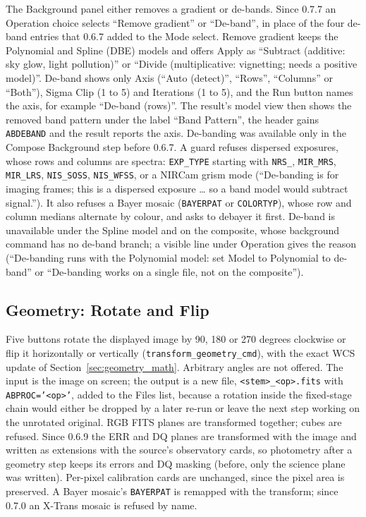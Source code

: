 \documentclass[11pt,a4paper]{article}
\newcommand{\code}[1]{\texttt{\small #1}}
\begin{document}
    The Background panel either removes a gradient or de-bands. Since 0.7.7 an Operation choice selects ``Remove gradient'' or ``De-band'', in place of the four de-band entries that 0.6.7 added to the Mode select. Remove gradient keeps the Polynomial and Spline (DBE) models and offers Apply as ``Subtract (additive: sky glow, light pollution)'' or ``Divide (multiplicative: vignetting; needs a positive model)''. De-band shows only Axis (``Auto (detect)'', ``Rows'', ``Columns'' or ``Both''), Sigma Clip (1 to 5) and Iterations (1 to 5), and the Run button names the axis, for example ``De-band (rows)''. The result's model view then shows the removed band pattern under the label ``Band Pattern'', the header gains \code{ABDEBAND} and the result reports the axis. De-banding was available only in the Compose Background step before 0.6.7. A guard refuses dispersed exposures, whose rows and columns are spectra: \code{EXP\_TYPE} starting with \code{NRS\_}, \code{MIR\_MRS}, \code{MIR\_LRS}, \code{NIS\_SOSS}, \code{NIS\_WFSS}, or a NIRCam grism mode (``De-banding is for imaging frames; this is a dispersed exposure \ldots{} so a band model would subtract signal.''). It also refuses a Bayer mosaic (\code{BAYERPAT} or \code{COLORTYP}), whose row and column medians alternate by colour, and asks to debayer it first. De-band is unavailable under the Spline model and on the composite, whose background command has no de-band branch; a visible line under Operation gives the reason (``De-banding runs with the Polynomial model: set Model to Polynomial to de-band'' or ``De-banding works on a single file, not on the composite'').

    \subsection{Geometry: Rotate and Flip}

    Five buttons rotate the displayed image by 90, 180 or 270 degrees clockwise or flip it horizontally or vertically (\code{transform\_geometry\_cmd}), with the exact WCS update of Section~\ref{sec:geometry_math}. Arbitrary angles are not offered. The input is the image on screen; the output is a new file, \code{<stem>\_<op>.fits} with \code{ABPROC='<op>'}, added to the Files list, because a rotation inside the fixed-stage chain would either be dropped by a later re-run or leave the next step working on the unrotated original. RGB FITS planes are transformed together; cubes are refused. Since 0.6.9 the ERR and DQ planes are transformed with the image and written as extensions with the source's observatory cards, so photometry after a geometry step keeps its errors and DQ masking (before, only the science plane was written). Per-pixel calibration cards are unchanged, since the pixel area is preserved. A Bayer mosaic's \code{BAYERPAT} is remapped with the transform; since 0.7.0 an X-Trans mosaic is refused by name.
\end{document}
